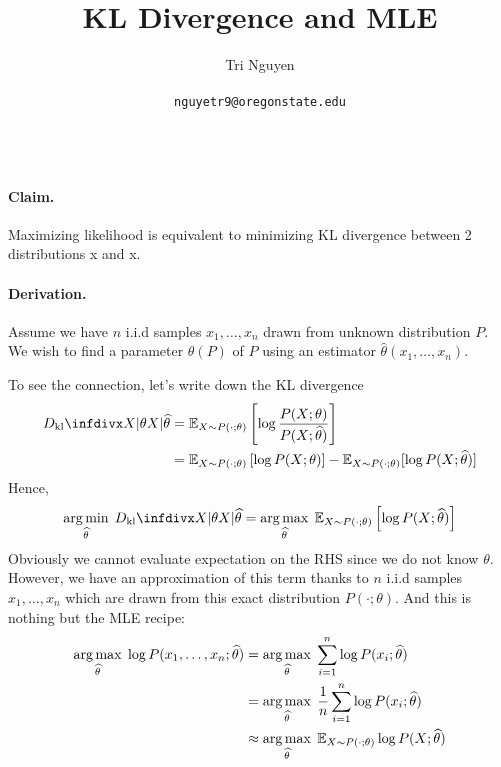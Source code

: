 \documentclass[11pt,a4paper]{article}
\title{KL Divergence and MLE}
\author{	Tri Nguyen \\\\
        \texttt{nguyetr9@oregonstate.edu} \\\\
        }
\begin{document}
\maketitle

\paragraph{Claim.} 
Maximizing likelihood is equivalent to minimizing KL divergence between 2 distributions x and x.

\paragraph{Derivation.} 
Assume we have $n$ i.i.d samples  $x_1, \ldots , x_n$ drawn from unknown distribution $P$. We wish to find a parameter $\theta(P)$ of $P$ using an estimator $\widehat{\theta}(x_1, \ldots , x_n)$.


To see the connection, let's write down the KL divergence
\begin{align*}
\Dkl{X|\theta}{X|\widehat{\theta}} 
&= \mathbb{E}_{X \sim P(\cdot; \theta)} \left[ \log \dfrac{P(X; \theta)}{P(X; \widehat{\theta})} \right] \\
&= \mathbb{E}_{X \sim P(\cdot; \theta)} \left[ \log P(X; \theta) \right]
- \mathbb{E}_{X \sim P(\cdot; \theta)} [\log P(X; \widehat{\theta})]
\end{align*}
Hence,  
\[
\argmin_{\widehat{\theta}} \;  \Dkl{X|\theta}{X|\widehat{\theta}}
= \argmax_{\widehat{\theta}} \;  \mathbb{E}_{X \sim P(\cdot ; \theta)} \left[  \log P(X ; \widehat{\theta}) \right]
\] 
Obviously we cannot evaluate expectation on the RHS since we do not know $\theta$. However, we have an approximation of this term thanks to $n$ i.i.d samples  $x_1, \ldots , x_n$ which are drawn from this exact distribution $P(\cdot; \theta)$.
And this is nothing but the MLE recipe:
\begin{align*}
\operatorname*{arg\,max}_{\widehat{\theta}} \; \log P(x_1, \ldots , x_n ; \widehat{\theta})
&= \operatorname*{arg\,max}_{\widehat{\theta}} \;  \sum^{n}_{i=1} \log P(x_i; \widehat{\theta})  \\
&= \operatorname*{arg\,max}_{\widehat{\theta}} \;  \dfrac{1}{n} \sum^{n}_{i=1} \log P(x_i; \widehat{\theta}) \\
&\approx \operatorname*{arg\,max}_{\widehat{\theta}} \;  \mathbb{E}_{X \sim P(\cdot; \theta)} \log P(X; \widehat{\theta})
\end{align*} 
\end{document}
